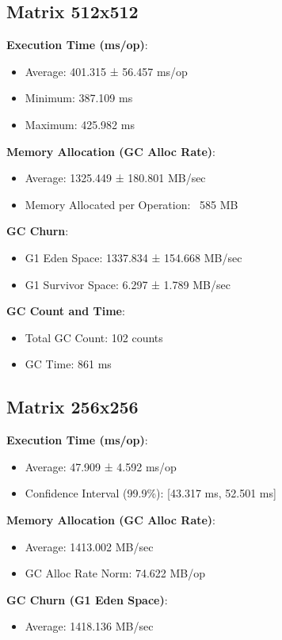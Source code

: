 \documentclass{article}
\begin{document}
\subsection{Matrix 512x512}
\textbf{Execution Time (ms/op)}:
\begin{itemize}
    \item Average: 401.315 ± 56.457 ms/op
    \item Minimum: 387.109 ms
    \item Maximum: 425.982 ms
\end{itemize}

\textbf{Memory Allocation (GC Alloc Rate)}:
\begin{itemize}
    \item Average: 1325.449 ± 180.801 MB/sec
    \item Memory Allocated per Operation: ~585 MB
\end{itemize}

\textbf{GC Churn}:
\begin{itemize}
    \item G1 Eden Space: 1337.834 ± 154.668 MB/sec
    \item G1 Survivor Space: 6.297 ± 1.789 MB/sec
\end{itemize}

\textbf{GC Count and Time}:
\begin{itemize}
    \item Total GC Count: 102 counts
    \item GC Time: 861 ms
\end{itemize}

\subsection{Matrix 256x256}
\textbf{Execution Time (ms/op)}:
\begin{itemize}
    \item Average: 47.909 ± 4.592 ms/op
    \item Confidence Interval (99.9\%): [43.317 ms, 52.501 ms]
\end{itemize}

\textbf{Memory Allocation (GC Alloc Rate)}:
\begin{itemize}
    \item Average: 1413.002 MB/sec
    \item GC Alloc Rate Norm: 74.622 MB/op
\end{itemize}

\textbf{GC Churn (G1 Eden Space)}:
\begin{itemize}
    \item Average: 1418.136 MB/sec
\end{itemize}
\end{document}
